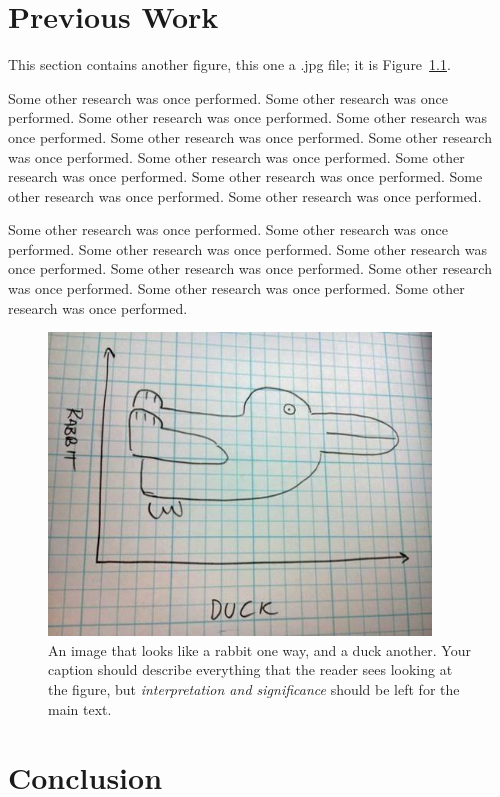 \documentclass[11pt]{ucscthesisbs}
\begin{document}
\chapter{Previous Work}

This section contains another figure, this one a .jpg file; it is Figure~\ref{fig:jpgfile}.

Some other research was once performed.
Some other research was once performed.
Some other research was once performed.
Some other research was once performed.
Some other research was once performed.
Some other research was once performed.
Some other research was once performed.
Some other research was once performed.
Some other research was once performed.
Some other research was once performed.
Some other research was once performed.

Some other research was once performed.
Some other research was once performed.
Some other research was once performed.
Some other research was once performed.
Some other research was once performed.
Some other research was once performed.
Some other research was once performed.
Some other research was once performed.

\begin{figure}[t!]
 \centerline{
  \includegraphics[width=4.0in]{rabbit-or-duck.jpg}
 }
\caption[Rabbit or duck?]
{An image that looks like a rabbit one way, and a duck another.  Your caption should describe everything that the reader sees looking at the figure, but {\it interpretation and significance} should be left for the main text.
}
\label{fig:jpgfile}
\end{figure}

\chapter{Conclusion}
\end{document}
